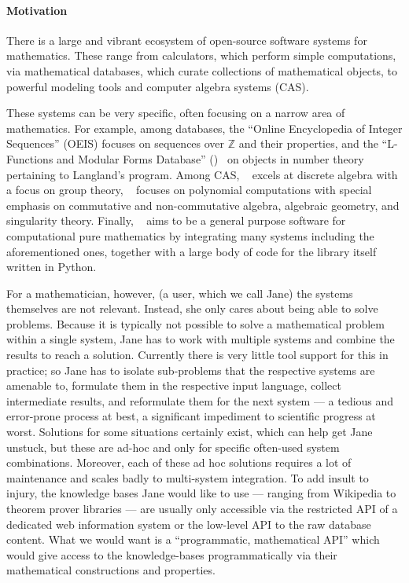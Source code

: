 \paragraph{Motivation}
There is a large and vibrant ecosystem of open-source software systems for mathematics. 
These range from calculators, which perform simple computations, via mathematical databases, which curate collections of mathematical objects, to powerful modeling tools and computer algebra systems (CAS).

These systems can be very specific, often focusing on a narrow area of mathematics.
For example, among databases, the ``Online Encyclopedia of Integer Sequences'' (OEIS) focuses on sequences over $\mathbb{Z}$ and their properties, and the ``L-Functions and Modular Forms Database'' (\LMFDB)~\cite{Cremona:LMFDB16,lmfdb:on} on objects in number theory pertaining to Langland's program.
Among CAS, \GAP~\cite{GAP:on} excels at discrete algebra with a focus on group theory, \Singular~\cite{singular:on} focuses on polynomial computations with special emphasis on commutative and non-commutative algebra, algebraic geometry, and singularity theory.
Finally, \Sage~\cite{SageMath:on} aims to be a general purpose software for computational pure mathematics by integrating many systems including the aforementioned ones, together with a large body of code for the {\Sage} library itself written in Python.

For a mathematician, however, (a user, which we call Jane) the systems themselves are not relevant.
Instead, she only cares about being able to solve problems. 
Because it is typically not possible to solve a mathematical problem within a single system, Jane has to work with multiple systems and combine the results to reach a solution. 
Currently there is very little tool support for this in practice; so Jane has to isolate sub-problems that the respective systems are amenable to, formulate them in the respective input language, collect intermediate results, and reformulate them for the next system --- a tedious and error-prone process at best, a significant impediment to scientific progress at worst.
Solutions for some situations certainly exist, which can help get Jane unstuck, but these are ad-hoc and only for specific often-used system combinations. 
Moreover, each of these ad hoc solutions requires a lot of maintenance and scales badly to
multi-system integration.
To add insult to injury, the knowledge bases Jane would like to use --- ranging from Wikipedia to theorem prover libraries --- are usually only accessible via the restricted API of a dedicated web information system or the low-level API to the raw database content.  
What we would want is a ``programmatic, mathematical API'' which would give access to the knowledge-bases programmatically via their mathematical constructions and properties.

